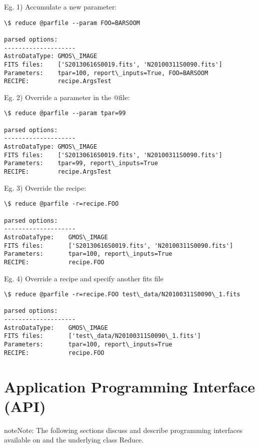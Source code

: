 \documentclass[letterpaper,10pt,english]{sphinxmanual}
\begin{document}
Eg. 1)  Accumulate a new parameter:

\begin{Verbatim}[commandchars=\\\{\}]
\$ reduce @parfile --param FOO=BARSOOM

parsed options:
--------------------
AstroDataType: GMOS\_IMAGE
FITS files:    ['S20130616S0019.fits', 'N20100311S0090.fits']
Parameters:    tpar=100, report\_inputs=True, FOO=BARSOOM
RECIPE:        recipe.ArgsTest
\end{Verbatim}

Eg. 2) Override a parameter in the @file:

\begin{Verbatim}[commandchars=\\\{\}]
\$ reduce @parfile --param tpar=99

parsed options:
--------------------
AstroDataType: GMOS\_IMAGE
FITS files:    ['S20130616S0019.fits', 'N20100311S0090.fits']
Parameters:    tpar=99, report\_inputs=True
RECIPE:        recipe.ArgsTest
\end{Verbatim}

Eg. 3) Override the recipe:

\begin{Verbatim}[commandchars=\\\{\}]
\$ reduce @parfile -r=recipe.FOO

parsed options:
--------------------
AstroDataType:    GMOS\_IMAGE
FITS files:       ['S20130616S0019.fits', 'N20100311S0090.fits']
Parameters:       tpar=100, report\_inputs=True
RECIPE:           recipe.FOO
\end{Verbatim}

Eg. 4) Override a recipe and specify another fits file

\begin{Verbatim}[commandchars=\\\{\}]
\$ reduce @parfile -r=recipe.FOO test\_data/N20100311S0090\_1.fits

parsed options:
--------------------
AstroDataType:    GMOS\_IMAGE
FITS files:       ['test\_data/N20100311S0090\_1.fits']
Parameters:       tpar=100, report\_inputs=True
RECIPE:           recipe.FOO
\end{Verbatim}


\section{Application Programming Interface (API)}
\label{interfaces:application-programming-interface-api}
\begin{notice}{note}{Note:}
The following sections discuss and describe programming interfaces
available on  and the underlying class Reduce.
\end{notice}
\end{document}
